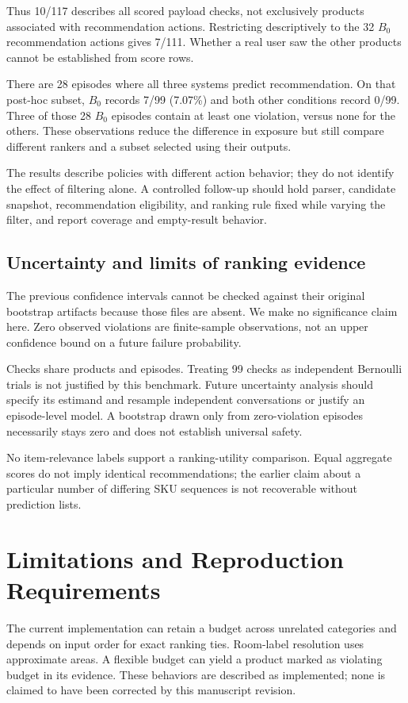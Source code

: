 \documentclass[conference,a4paper]{IEEEtran}
\begin{document}
Thus 10/117 describes all scored payload checks, not exclusively products associated with recommendation actions. Restricting descriptively to the 32 $B_0$ recommendation actions gives 7/111. Whether a real user saw the other products cannot be established from score rows.

There are 28 episodes where all three systems predict recommendation. On that post-hoc subset, $B_0$ records 7/99 (7.07\%) and both other conditions record 0/99. Three of those 28 $B_0$ episodes contain at least one violation, versus none for the others. These observations reduce the difference in exposure but still compare different rankers and a subset selected using their outputs.

The results describe policies with different action behavior; they do not identify the effect of filtering alone. A controlled follow-up should hold parser, candidate snapshot, recommendation eligibility, and ranking rule fixed while varying the filter, and report coverage and empty-result behavior.

\subsection{Uncertainty and limits of ranking evidence}
The previous confidence intervals cannot be checked against their original bootstrap artifacts because those files are absent. We make no significance claim here. Zero observed violations are finite-sample observations, not an upper confidence bound on a future failure probability.

Checks share products and episodes. Treating 99 checks as independent Bernoulli trials is not justified by this benchmark. Future uncertainty analysis should specify its estimand and resample independent conversations or justify an episode-level model. A bootstrap drawn only from zero-violation episodes necessarily stays zero and does not establish universal safety.

No item-relevance labels support a ranking-utility comparison. Equal aggregate scores do not imply identical recommendations; the earlier claim about a particular number of differing SKU sequences is not recoverable without prediction lists.

\section{Limitations and Reproduction Requirements}
The current implementation can retain a budget across unrelated categories and depends on input order for exact ranking ties. Room-label resolution uses approximate areas. A flexible budget can yield a product marked as violating budget in its evidence. These behaviors are described as implemented; none is claimed to have been corrected by this manuscript revision.
\end{document}
